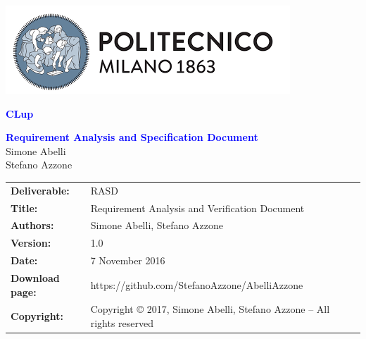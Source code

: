 
\usepackage[utf8]{inputenc}



\begin{titlepage}



\centering
\includegraphics[scale=0.5]{Images/PolimiLogo}

\vspace{4cm}

{\textcolor{Blue}{\textbf{\Huge{CLup}}}} \\ [1cm]


\vspace{4cm}

{\textcolor{Blue}{\textbf{\Huge{Requirement Analysis and Specification
        Document}}}} \\ [1cm]

\vspace{4cm}
Simone Abelli \\
Stefano Azzone

\end{titlepage}

\begin{table}[h!]
\begin{tabu} to \textwidth { X[0.3,r,p] X[0.7,l,p] }
\hline

\textbf{Deliverable:} & RASD\\
\textbf{Title:} & Requirement Analysis and Verification Document \\
\textbf{Authors:} & Simone Abelli, Stefano Azzone \\
\textbf{Version:} & 1.0 \\ 
\textbf{Date:} & 7 November 2016 \\
\textbf{Download page:} & https://github.com/StefanoAzzone/AbelliAzzone \\
\textbf{Copyright:} & Copyright © 2017, Simone Abelli, Stefano Azzone – All rights reserved \\
\hline
\end{tabu}
\end{table}




